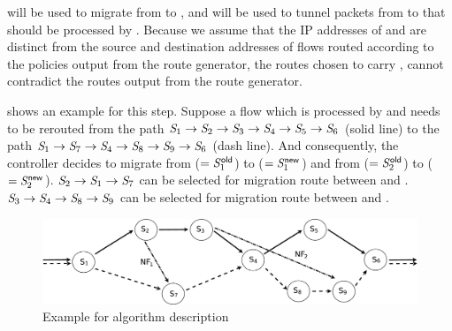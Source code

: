 \flowIDMigrate{\nfIdx} will be used to migrate \nfID{\nfIdx} from
\oldSwitchID{\nfIdx} to \newSwitchID{\nfIdx}, and
\flowIDTunnel{\nfIdx} will be used to tunnel packets from
\oldSwitchID{\nfIdx} to \newSwitchID{\nfIdx} that should be processed
by \nfID{\nfIdx}.  Because we assume that the IP addresses of
\oldSwitchID{\nfIdx} and \newSwitchID{\nfIdx} are distinct from the
source and destination addresses of flows routed according to the
policies output from the route generator, the routes chosen to carry
\flowIDMigrate{\nfIdx}, \flowIDTunnel{\nfIdx} cannot contradict the
routes output from the route generator.

 shows an example for this step.  Suppose
a flow \flowID{} which is processed by  and  needs to
be rerouted from the path $\switchID{1} \rightarrow \switchID{2}
\rightarrow \switchID{3} \rightarrow \switchID{4} \rightarrow
\switchID{5} \rightarrow \switchID{6}$ (solid line) to the path
$\switchID{1} \rightarrow \switchID{7} \rightarrow \switchID{4}
\rightarrow \switchID{8} \rightarrow \switchID{9} \rightarrow
\switchID{6}$ (dash line).  And consequently, the controller decides
to migrate  from  ($= \oldSwitchID{1}$) to
 ($= \newSwitchID{1}$) and  from  ($=
\oldSwitchID{2}$) to  ($= \newSwitchID{2}$).
$\switchID{2} \rightarrow \switchID{1} \rightarrow \switchID{7}$ can
be selected for migration route between  and
. $\switchID{3} \rightarrow \switchID{4} \rightarrow
\switchID{8} \rightarrow \switchID{9}$ can be selected for migration
route between  and .

\begin{figure}
\centering
\includegraphics[width=0.95\columnwidth]{algorithmExample.eps}

\caption{Example for algorithm description}
\label{fig:algorithmExample}
\end{figure}

